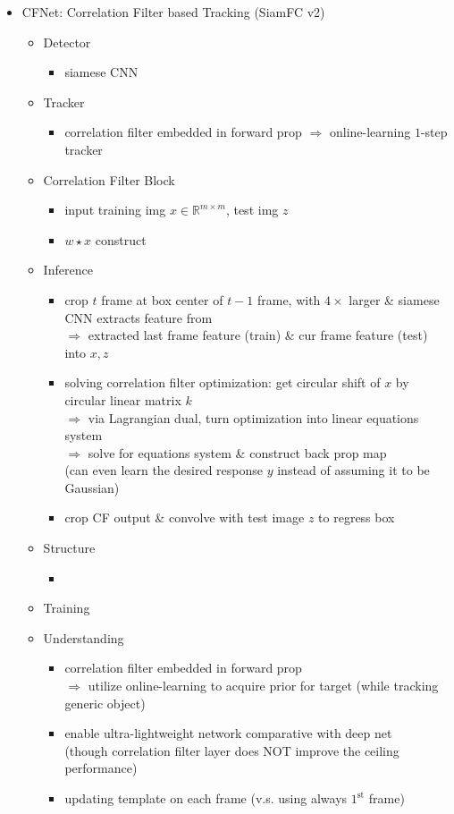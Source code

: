 \begin{itemize}
\item CFNet: Correlation Filter based Tracking (SiamFC v2)
	\begin{itemize}
	\item Detector
		\begin{itemize}
		\item siamese CNN 
		\end{itemize}
	\item Tracker
		\begin{itemize}
		\item correlation filter embedded in forward prop $\Rightarrow$ online-learning $1$-step tracker
		\end{itemize}
	\item Correlation Filter Block
		\begin{itemize}
		\item input training img $x\in \mathbb R^{m\times m}$, test img $z$
		\item $w\star x$ construct 
		\end{itemize}
	\item Inference
		\begin{itemize}
		\item crop $t$ frame at box center of $t-1$ frame, with $4\times$ larger \& siamese CNN extracts feature from \\
		$\Rightarrow$ extracted last frame feature (train) \& cur frame feature (test) into $x, z$
		\item solving correlation filter optimization: get circular shift of $x$ by circular linear matrix $k$ \\
		$\Rightarrow$ via Lagrangian dual, turn optimization into linear equations system \\
		$\Rightarrow$ solve for equations system \& construct back prop map \\
		(can even learn the desired response $y$ instead of assuming it to be Gaussian)
		\item crop CF output \& convolve with test image $z$ to regress box
		\end{itemize}
	\item Structure
		\begin{itemize}
		\item 
		\end{itemize}
	\item Training
	\item Understanding
		\begin{itemize}
		\item correlation filter embedded in forward prop \\ 
		$\Rightarrow$ utilize online-learning to acquire prior for target (while tracking generic object)
		\item enable ultra-lightweight network comparative with deep net \\
		(though correlation filter layer does NOT improve the ceiling performance)
		\item updating template on each frame (v.s. using always $1^\text{st}$ frame)
		\end{itemize}
	\end{itemize}


\end{itemize}
